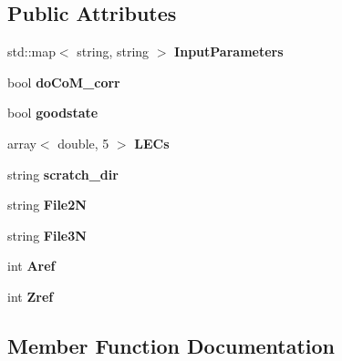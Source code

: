\subsection*{Public Attributes}
\begin{DoxyCompactItemize}
\item 
std\+::map$<$ string, string $>$ {\bfseries Input\+Parameters}\hypertarget{classReadWrite_aa99ba50a35d8391285c1bdde1f1c206d}{}\label{classReadWrite_aa99ba50a35d8391285c1bdde1f1c206d}

\item 
bool {\bfseries do\+Co\+M\+\_\+corr}\hypertarget{classReadWrite_a3221f4b824dc385b066eca732339ee72}{}\label{classReadWrite_a3221f4b824dc385b066eca732339ee72}

\item 
bool {\bfseries goodstate}\hypertarget{classReadWrite_aaf2753e15a5e7f524d6fde9f15ab357b}{}\label{classReadWrite_aaf2753e15a5e7f524d6fde9f15ab357b}

\item 
array$<$ double, 5 $>$ {\bfseries L\+E\+Cs}\hypertarget{classReadWrite_a98868a5ad922435a81990dc2cb8db4d0}{}\label{classReadWrite_a98868a5ad922435a81990dc2cb8db4d0}

\item 
string {\bfseries scratch\+\_\+dir}\hypertarget{classReadWrite_ad561dc713d8daa4a7438e636a9c2da8c}{}\label{classReadWrite_ad561dc713d8daa4a7438e636a9c2da8c}

\item 
string {\bfseries File2N}\hypertarget{classReadWrite_a2dadd983281d5b8451500ff3bb79150a}{}\label{classReadWrite_a2dadd983281d5b8451500ff3bb79150a}

\item 
string {\bfseries File3N}\hypertarget{classReadWrite_ae82a432e5604c503e206d40843e44b87}{}\label{classReadWrite_ae82a432e5604c503e206d40843e44b87}

\item 
int {\bfseries Aref}\hypertarget{classReadWrite_aca5f0cb236385d203bee1161f36d13a4}{}\label{classReadWrite_aca5f0cb236385d203bee1161f36d13a4}

\item 
int {\bfseries Zref}\hypertarget{classReadWrite_a1d6ac500b2e1e8f76c8df799a114120f}{}\label{classReadWrite_a1d6ac500b2e1e8f76c8df799a114120f}

\end{DoxyCompactItemize}


\subsection{Member Function Documentation}
